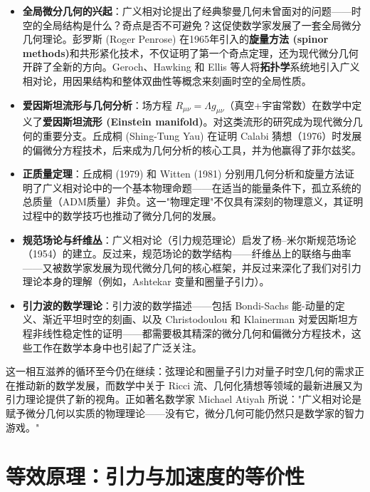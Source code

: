 \begin{itemize}
    \item \textbf{全局微分几何的兴起}：广义相对论提出了经典黎曼几何未曾面对的问题——时空的全局结构是什么？奇点是否不可避免？这促使数学家发展了一套全局微分几何理论。彭罗斯 (Roger Penrose) 在1965年引入的\textbf{旋量方法 (spinor methods)}和共形紧化技术，不仅证明了第一个奇点定理，还为现代微分几何开辟了全新的方向。Geroch、Hawking 和 Ellis 等人将\textbf{拓扑学}系统地引入广义相对论，用因果结构和整体双曲性等概念来刻画时空的全局性质。
    
    \item \textbf{爱因斯坦流形与几何分析}：场方程 $R_{\mu\nu} = \Lambda g_{\mu\nu}$（真空+宇宙常数）在数学中定义了\textbf{爱因斯坦流形 (Einstein manifold)}。对这类流形的研究成为现代微分几何的重要分支。丘成桐 (Shing-Tung Yau) 在证明 Calabi 猜想（1976）时发展的偏微分方程技术，后来成为几何分析的核心工具，并为他赢得了菲尔兹奖。
    
    \item \textbf{正质量定理}：丘成桐 (1979) 和 Witten (1981) 分别用几何分析和旋量方法证明了广义相对论中的一个基本物理命题——在适当的能量条件下，孤立系统的总质量（ADM质量）非负。这一"物理定理"不仅具有深刻的物理意义，其证明过程中的数学技巧也推动了微分几何的发展。
    
    \item \textbf{规范场论与纤维丛}：广义相对论（引力规范理论）启发了杨--米尔斯规范场论（1954）的建立。反过来，规范场论的数学结构——纤维丛上的联络与曲率——又被数学家发展为现代微分几何的核心框架，并反过来深化了我们对引力理论本身的理解（例如，Ashtekar 变量和圈量子引力）。
    
    \item \textbf{引力波的数学理论}：引力波的数学描述——包括 Bondi-Sachs 能-动量的定义、渐近平坦时空的刻画、以及 Christodoulou 和 Klainerman 对爱因斯坦方程非线性稳定性的证明——都需要极其精深的微分几何和偏微分方程技术，这些工作在数学本身中也引起了广泛关注。
\end{itemize}

这一相互滋养的循环至今仍在继续：弦理论和圈量子引力对量子时空几何的需求正在推动新的数学发展，而数学中关于 Ricci 流、几何化猜想等领域的最新进展又为引力理论提供了新的视角。正如著名数学家 Michael Atiyah 所说："广义相对论是赋予微分几何以实质的物理理论——没有它，微分几何可能仍然只是数学家的智力游戏。"

\section{等效原理：引力与加速度的等价性}
\label{sec:equivalence_principle}

